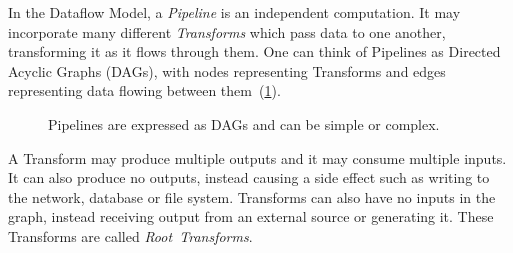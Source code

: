 In the Dataflow Model, a \emph{Pipeline} is an independent computation.
It may incorporate many different \emph{Transforms} which pass data to one another, transforming it as it flows through them.
One can think of Pipelines as Directed Acyclic Graphs (DAGs), with nodes representing Transforms and edges representing data flowing between them~(\cref{fig:prep:pipeline-dags}).

\begin{figure}[t]
	\caption[Examples of Pipelines, simple and complex, illustrated as Directed Acyclic Graphs.]{Pipelines are expressed as DAGs and can be simple or complex.}
	\label{fig:prep:pipeline-dags}
\end{figure}

A Transform may produce multiple outputs and it may consume multiple inputs.
It can also produce no outputs, instead causing a side effect such as writing to the network, database or file system.
Transforms can also have no inputs in the graph, instead receiving output from an external source or generating it.
These Transforms are called \emph{Root~Transforms}.

